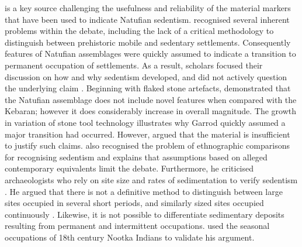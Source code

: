 \documentclass[%
	]{ijsra}
\begin{document}
\textcite{Edwards_1989} is a key source challenging the usefulness and reliability of the material markers that have been used to indicate Natufian sedentism. 
\textcite[8]{Edwards_1989} recognised several inherent problems within the debate, including the lack of a critical methodology to distinguish between prehistoric mobile and sedentary settlements. Consequently features of Natufian assemblages were quickly assumed to indicate a transition to permanent occupation of settlements. 
As a result, scholars focused their discussion on how and why sedentism developed, and did not actively question the underlying claim \parencite[8]{Edwards_1989}. 
Beginning with flaked stone artefacts, \textcite[11]{Edwards_1989} demonstrated that the Natufian assemblage does not include novel features when compared with the Kebaran; however it does considerably increase in overall magnitude. 
The growth in variation of stone tool technology illustrates why Garrod quickly assumed a major transition had occurred. However, \textcite[11]{Edwards_1989} argued that the material is insufficient to justify such claims. 
\textcite[15]{Edwards_1989} also recognised the problem of ethnographic comparisons for recognising sedentism and explains that assumptions based on alleged contemporary equivalents limit the debate. 
Furthermore, he criticised archaeologists who rely on site size and rates of sedimentation to verify sedentism \parencite[15]{Edwards_1989}. 
He argued that there is not a definitive method to distinguish between large sites occupied in several short periods, and similarly sized sites occupied continuously \parencite[15]{Edwards_1989}. 
Likewise, it is not possible to differentiate sedimentary deposits resulting from permanent and intermittent occupations. \textcite[15]{Edwards_1989} used the seasonal occupations of 18th century Nootka Indians to validate his argument. 
\end{document}
